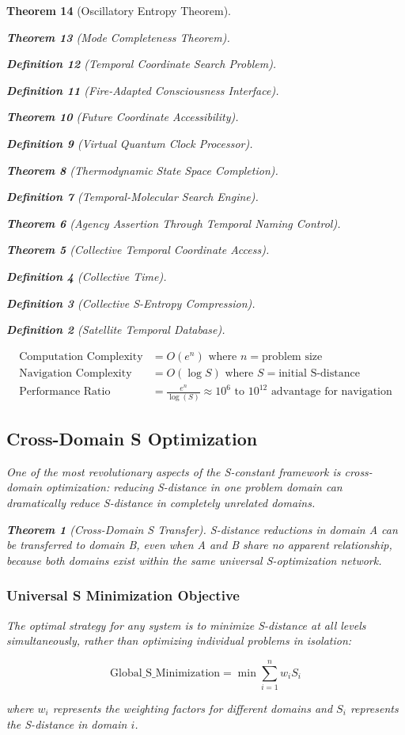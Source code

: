\documentclass[12pt,a4paper]{article}
\newtheorem{theorem}{Theorem}[section]
\newtheorem{definition}[theorem]{Definition}
\begin{document}
\begin{theorem}[Oscillatory Entropy Theorem]
\begin{theorem}[Mode Completeness Theorem]
\begin{enumerate}
\begin{definition}[Temporal Coordinate Search Problem]
\begin{algorithm}
\begin{definition}[Fire-Adapted Consciousness Interface]
\begin{theorem}[Future Coordinate Accessibility]
\begin{definition}[Virtual Quantum Clock Processor]
\begin{itemize}
\begin{itemize}
\begin{theorem}[Thermodynamic State Space Completion]
\begin{definition}[Temporal-Molecular Search Engine]
\begin{theorem}[Agency Assertion Through Temporal Naming Control]
\begin{remark}
\begin{theorem}[Collective Temporal Coordinate Access]
\begin{definition}[Collective Time]
\begin{definition}[Collective S-Entropy Compression]
\begin{definition}[Satellite Temporal Database]
\begin{algorithm}
\begin{table}[h]
{{\begin{align}
\text{Computation Complexity} &= O(e^n) \text{ where } n = \text{problem size} \\
\text{Navigation Complexity} &= O(\log S) \text{ where } S = \text{initial S-distance} \\
\text{Performance Ratio} &= \frac{e^n}{\log(S)} \approx 10^6 \text{ to } 10^{12} \text{ advantage for navigation}
\end{align}

\subsection{Cross-Domain S Optimization}

One of the most revolutionary aspects of the S-constant framework is cross-domain optimization: reducing S-distance in one problem domain can dramatically reduce S-distance in completely unrelated domains.

\begin{theorem}[Cross-Domain S Transfer]
S-distance reductions in domain A can be transferred to domain B, even when A and B share no apparent relationship, because both domains exist within the same universal S-optimization network.
\end{theorem}

\subsubsection{Universal S Minimization Objective}

The optimal strategy for any system is to minimize S-distance at all levels simultaneously, rather than optimizing individual problems in isolation:

$$\text{Global\_S\_Minimization} = \min \sum_{i=1}^{n} w_i S_i$$

where $w_i$ represents the weighting factors for different domains and $S_i$ represents the S-distance in domain $i$.

}}
\end{table}
\end{algorithm}
\end{definition}
\end{definition}
\end{definition}
\end{theorem}
\end{remark}
\end{theorem}
\end{definition}
\end{theorem}
\end{itemize}
\end{itemize}
\end{definition}
\end{theorem}
\end{definition}
\end{algorithm}
\end{definition}
\end{enumerate}
\end{theorem}
\end{theorem}
\end{document}
